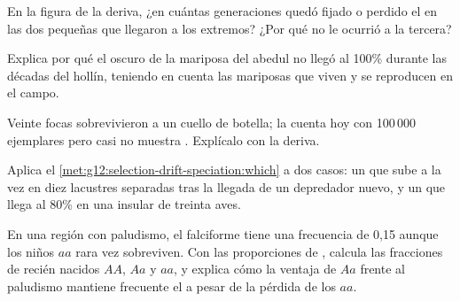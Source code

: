 \begin{exercise}[$\star\star$]\label{exo:g12:selection-drift-speciation:8}
En la figura de la deriva, ¿en cuántas generaciones quedó fijado o
perdido el  en las dos  pequeñas que llegaron a los
extremos? ¿Por qué no le ocurrió a la tercera?
\end{exercise}

\begin{exercise}[$\star\star$]\label{exo:g12:selection-drift-speciation:9}
Explica por qué el  oscuro de la mariposa del abedul no llegó al
100\% durante las décadas del hollín, teniendo en cuenta las mariposas
que viven y se reproducen en el campo.
\end{exercise}

\begin{exercise}[$\star\star$]\label{exo:g12:selection-drift-speciation:10}
Veinte focas sobrevivieron a un cuello de botella; la  cuenta
hoy con 100\,000 ejemplares pero casi no muestra .
Explícalo con la deriva.
\end{exercise}

\begin{exercise}[$\star\star$]\label{exo:g12:selection-drift-speciation:11}
Aplica el \cref{met:g12:selection-drift-speciation:which} a dos casos:
un  que sube a la vez en diez  lacustres separadas tras
la llegada de un depredador nuevo, y un  que llega al 80\% en una
 insular de treinta aves.
\end{exercise}

\begin{exercise}[$\star\star\star$]\label{exo:g12:selection-drift-speciation:12}
En una región con paludismo, el  falciforme tiene una frecuencia
de 0,15 aunque los niños $aa$ rara vez sobreviven. Con las proporciones
de , calcula las fracciones de recién nacidos $AA$, $Aa$ y
$aa$, y explica cómo la ventaja de $Aa$ frente al paludismo mantiene
frecuente el  a pesar de la pérdida de los $aa$.
\end{exercise}

